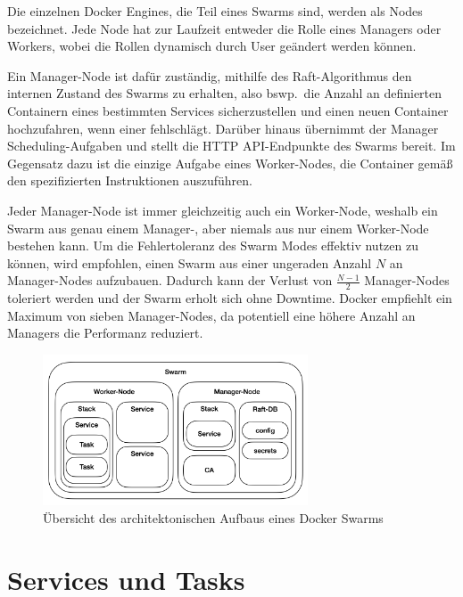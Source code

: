 Die einzelnen Docker Engines, die Teil eines Swarms sind, werden als Nodes bezeichnet. 
Jede Node hat zur Laufzeit entweder die Rolle eines Managers oder Workers, wobei die Rollen dynamisch durch User ge\"andert werden k\"onnen. 

Ein Manager-Node ist daf\"ur zust\"andig, mithilfe des Raft-Algorithmus den internen Zustand des Swarms zu erhalten, also bswp.\ die Anzahl an definierten Containern eines bestimmten Services sicherzustellen und einen neuen Container hochzufahren, wenn einer fehlschl\"agt. 
Dar\"uber hinaus \"ubernimmt der Manager Scheduling-Aufgaben und stellt die HTTP API-Endpunkte des Swarms bereit. 
Im Gegensatz dazu ist die einzige Aufgabe eines Worker-Nodes, die Container gem\"a{\ss} den spezifizierten Instruktionen auszuf\"uhren. 

Jeder Manager-Node ist immer gleichzeitig auch ein Worker-Node, weshalb ein Swarm aus genau einem Manager-, aber niemals aus nur einem Worker-Node bestehen kann. 
Um die Fehlertoleranz des Swarm Modes effektiv nutzen zu k\"onnen, wird empfohlen, einen Swarm aus einer ungeraden Anzahl $N$ an Manager-Nodes aufzubauen. 
Dadurch kann der Verlust von $\frac{N-1}{2}$ Manager-Nodes toleriert werden und der Swarm erholt sich ohne Downtime. 
Docker empfiehlt ein Maximum von sieben Manager-Nodes, da potentiell eine h\"ohere Anzahl an Managers die Performanz reduziert.\cite{Docker_Engine_Nodes}

\begin{figure}[h]
    \centering
    \includegraphics[width=0.7\textwidth]{figures/SwarmArchitecture.png}
    \caption{\"Ubersicht des architektonischen Aufbaus eines Docker Swarms}
    \label{fig:docker-swarm-architecture}
\end{figure}

\section{Services und Tasks}

